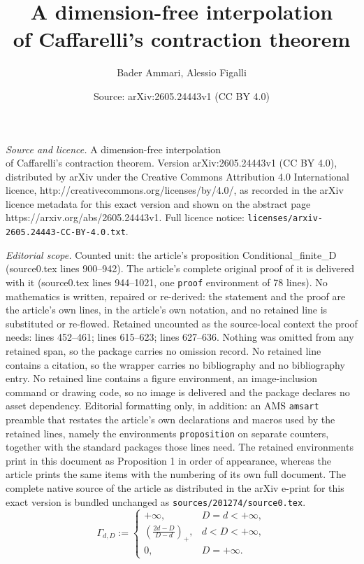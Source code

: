 \documentclass[10pt,a4paper]{amsart}
\title{A dimension-free interpolation\\ of Caffarelli’s contraction theorem}
\author{Bader Ammari, Alessio Figalli}
\date{Source: arXiv:2605.24443v1 (CC BY 4.0)}
\begin{document}
\maketitle

\noindent\emph{Source and licence.} A dimension-free interpolation\\ of Caffarelli’s contraction theorem. Version arXiv:2605.24443v1 (CC BY 4.0), distributed by arXiv under the Creative Commons Attribution 4.0 International licence, http://creativecommons.org/licenses/by/4.0/, as recorded in the arXiv licence metadata for this exact version and shown on the abstract page https://arxiv.org/abs/2605.24443v1. Full licence notice: \texttt{licenses/arxiv-2605.24443-CC-BY-4.0.txt}.\par\smallskip

\noindent\textit{Editorial scope.} Counted unit: the article's proposition Conditional\_finite\_D (source0.tex lines 900--942). The article's complete original proof of it is delivered with it (source0.tex lines 944--1021, one \texttt{proof} environment of 78 lines). No mathematics is written, repaired or re-derived: the statement and the proof are the article's own lines, in the article's own notation, and no retained line is substituted or re-flowed.  Retained uncounted as the source-local context the proof needs: lines 452--461; lines 615--623; lines 627--636.  Nothing was omitted from any retained span, so the package carries no omission record.  No retained line contains a citation, so the wrapper carries no bibliography and no bibliography entry.  No retained line contains a figure environment, an image-inclusion command or drawing code, so no image is delivered and the package declares no asset dependency.  Editorial formatting only, in addition: an AMS \texttt{amsart} preamble that restates the article's own declarations and macros used by the retained lines, namely the environments \texttt{proposition} on separate counters, together with the standard packages those lines need.  The retained environments print in this document as Proposition 1 in order of appearance, whereas the article prints the same items with the numbering of its own full document.  The complete native source of the article as distributed in the arXiv e-print for this exact version is bundled unchanged as \texttt{sources/201274/source0.tex}.
\begin{equation}\label{Gamma_definition}
\Gamma_{d,D}:=
\begin{cases}
\displaystyle
+\infty, & D=d<+\infty,\\[0.8em]
\displaystyle
\left(\frac{2d-D}{D-d}\right)_+, & d<D<+\infty,\\[0.8em]
0, & D=+\infty.
\end{cases}
\end{equation}
\end{document}
